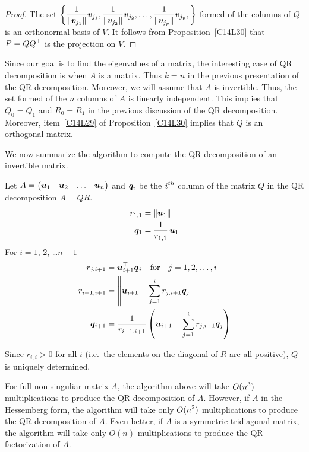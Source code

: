 \begin{proof}
The set $\displaystyle \left\{ \frac{1}{\|\bm{v}_{j_1}\|}\bm{v}_{j_1} ,
\frac{1}{\|\bm{v}_{j_2}\|}\bm{v}_{j_2} , \ldots ,
\frac{1}{\|\bm{v}_{j_p}\|}\bm{v}_{j_p} ,\right\}$ formed of the columns
of $Q$ is an orthonormal basis of $V$.
It follows from Proposition~\ref{C14L30} that $\displaystyle P = QQ^\top$ is
the projection on $V$.
\end{proof}

Since our goal is to find the eigenvalues of a matrix, the interesting
case of QR decomposition is when $A$ is a \nn matrix.  Thus $k=n$ in
the previous presentation of the QR decomposition.  Moreover, we
will assume that $A$ is invertible.  Thus, the set formed of the $n$
columns of $A$ is linearly independent.   This implies that
$Q_0 = Q_1$ and $R_0 = R_1$ in the previous discussion of the QR
decomposition.  Moreover, item~\ref{C14L29} of
Proposition~\ref{C14L30} implies that $Q$ is an orthogonal
matrix.

We now summarize the algorithm to compute the QR decomposition of an
\nn invertible matrix.

\begin{algo}
Let
$A = \begin{pmatrix} \bm{u}_1 & \bm{u}_2 & \ldots & \bm{u}_n\end{pmatrix}$
and $\bm{q}_i$ be the $\displaystyle i^{th}$ column of the matrix $Q$
in the QR decomposition $A = QR$.
\begin{align*}
r_{1,1} &= \|\bm{u}_1\| \\
\bm{q}_1 &= \frac{1}{r_{1,1}}\, \bm{u}_1
\end{align*}
For $i=1$, $2$, \ldots $n-1$
\begin{align*}
r_{j,i+1} &= \bm{u}_{i+1}^\top \bm{q}_j \quad \text{for} \quad
j=1,2,\ldots,i \\
r_{i+1,i+1} &= \left\| \bm{u}_{i+1} - \sum_{j=1}^i r_{j,i+1}\bm{q}_j
\right\| \\
\bm{q}_{i+1} &= \frac{1}{r_{i+1.i+1}} \left(
\bm{u}_{i+1} - \sum_{j=1}^i r_{j,i+1}\bm{q}_j \right)
\end{align*}
\end{algo}

Since $r_{i,i}>0$ for all $i$ (i.e.\ the elements on the diagonal of
$R$ are all positive), $Q$ is uniquely determined.

\begin{rmk}
For full non-singuliar matrix $A$, the algorithm above will take
$\displaystyle O(n^3)$ multiplications to produce the QR decomposition of $A$.
However, if $A$ in the Hessemberg form, the algorithm will take only
$\displaystyle O(n^2)$ multiplications to produce the QR decomposition
of $A$.  Even better, if $A$ is a symmetric tridiagonal matrix, the
algorithm will take only $O(n)$ multiplications to produce the QR
factorization of $A$.
\label{C14L32}
\end{rmk}

